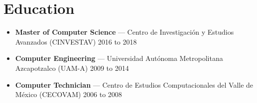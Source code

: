 \section*{Education}
\begin{itemize}[leftmargin=12pt]
    \item \textbf{Master of Computer Science} — Centro de Investigación y Estudios Avanzados (CINVESTAV) \hfill 2016 to 2018
    \item \textbf{Computer Engineering} — Universidad Autónoma Metropolitana Azcapotzalco (UAM-A) \hfill 2009 to 2014
    \item \textbf{Computer Technician} — Centro de Estudios Computacionales del Valle de México (CECOVAM) \hfill 2006 to 2008
\end{itemize}

